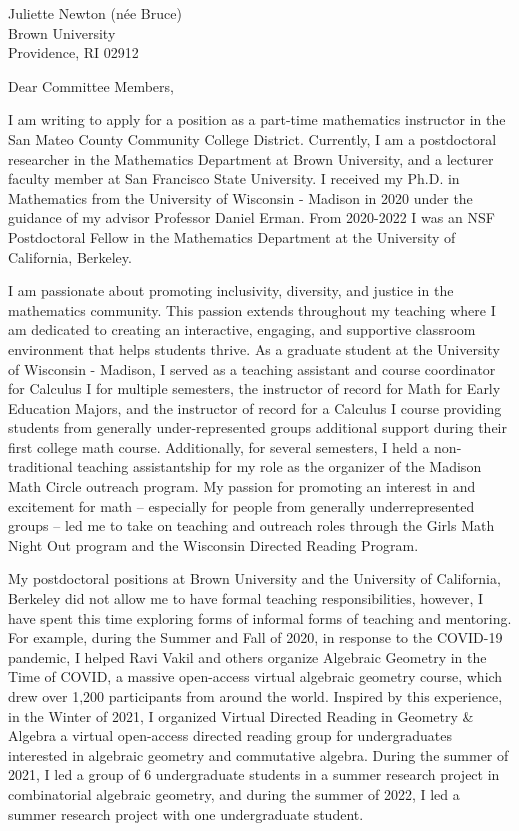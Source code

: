 \documentclass[11pt]{brownletter}
\date{October 14, 2023} %
\begin{document}
\begin{letter}{Juliette Newton (n\'{e}e Bruce)\\ 
               Brown University\\ 
               Providence, RI 02912}

\opening{Dear Committee Members,}

I am writing to apply for a position as a part-time mathematics instructor in the San Mateo County Community College District. Currently, I am a postdoctoral researcher in the Mathematics Department at Brown University, and a lecturer faculty member at San Francisco State University. I received my Ph.D. in Mathematics from the University of Wisconsin - Madison in 2020 under the guidance of my advisor Professor Daniel Erman. From 2020-2022 I was an NSF Postdoctoral Fellow in the Mathematics Department at the University of California, Berkeley.

I am passionate about promoting inclusivity, diversity, and justice in the mathematics community. This passion extends throughout my teaching where I am dedicated to creating an interactive, engaging, and supportive classroom environment that helps students thrive. As a graduate student at the University of Wisconsin - Madison, I served as a teaching assistant and course coordinator for Calculus I for multiple semesters, the instructor of record for Math for Early Education Majors, and the instructor of record for a Calculus I course providing students from generally under-represented groups additional support during their first college math course. Additionally, for several semesters, I held a non-traditional teaching assistantship for my role as the organizer of the Madison Math Circle outreach program. My passion for promoting an interest in and excitement for math – especially for people from generally underrepresented groups – led me to take on teaching and outreach roles through the Girls Math Night Out program and the Wisconsin Directed Reading Program.

My postdoctoral positions at Brown University and the University of California, Berkeley did not allow me to have formal teaching responsibilities, however, I have spent this time exploring forms of informal forms of teaching and mentoring. For example, during the Summer and Fall of 2020, in response to the COVID-19 pandemic, I helped Ravi Vakil and others organize Algebraic Geometry in the Time of COVID, a massive open-access virtual algebraic geometry course, which drew over 1,200 participants from around the world. Inspired by this experience, in the Winter of 2021, I organized Virtual Directed Reading in Geometry \& Algebra a virtual open-access directed reading group for undergraduates interested in algebraic geometry and commutative algebra. During the summer of 2021, I led a group of 6 undergraduate students in a summer research project in combinatorial algebraic geometry, and during the summer of 2022, I led a summer research project with one undergraduate student.


\end{letter}
\end{document}
